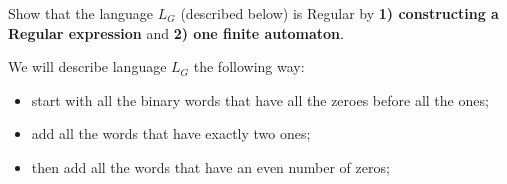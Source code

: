 \documentclass[12pt]{article}
\newenvironment{exercise}[2][Exercise]{\begin{trivlist}
\item[\hskip \labelsep {\bfseries #1}\hskip \labelsep {\bfseries #2.}]}{\end{trivlist}}
\begin{document}
\newpage


\begin{exercise}{4}

Show that the language $L_G$ (described below) is Regular by \textbf{1) constructing a Regular expression} and \textbf{ 2) one finite automaton}.


We will describe language $L_G$ the following way: 

\begin{itemize}
    \item start with all the binary words that have all the zeroes before all the ones;
    \item add all the words that have exactly two ones;
    \item then add all the words that have an even number of zeros;
\end{itemize}

\end{exercise}
\end{document}
